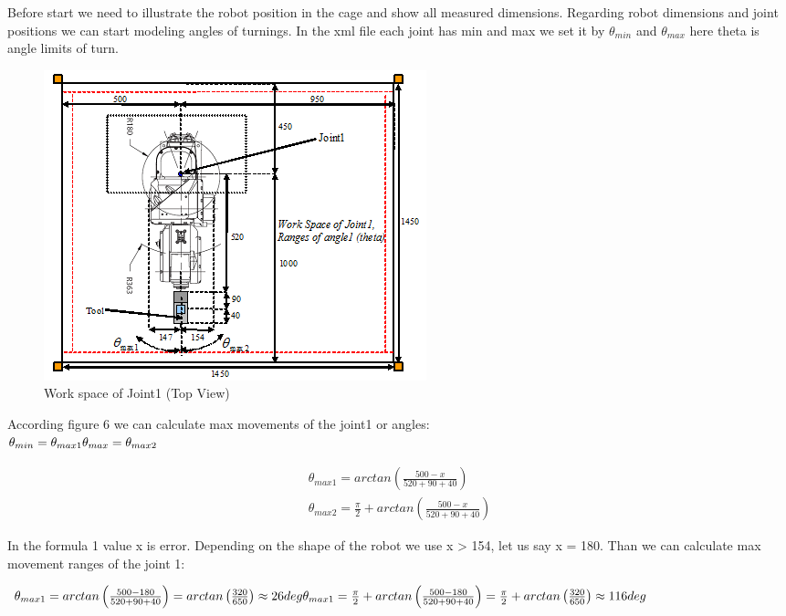 Before start we need to illustrate the robot position in the cage and show all measured dimensions. Regarding robot dimensions and joint positions we can start modeling angles of turnings. In the xml file each joint has min and max we set it by $\theta _{min}$ and $\theta _{max}$ here theta is angle limits of turn.

\begin{figure}[H]
  \centering
  \includegraphics[scale= 1]{source/JointWorkspaceDimensions.png}
  \caption{Work space of Joint1 (Top View)}
  \label{fig:JointWorkspaceDimensions}
\end{figure}

According figure 6 we can calculate max movements of the joint1 or angles: \\

\noindent$\theta _{min}=\theta _{max1}\\
\theta _{max}=\theta _{max2}$

\begin{align}
\theta _{max1}=arctan\left ( \frac{500-x}{520+90+40} \right ) \label{eq:eq0}\\
\theta _{max2}=\frac{\pi }{2}+arctan\left ( \frac{500-x}{520+90+40} \right )\label{eq:eq1}
\end{align}

In the formula 1 value x is error. Depending on the shape of the robot we use x > 154, let us say x = 180. Than we can calculate max movement ranges of the joint 1:

\noindent$\theta _{max1}=arctan\left ( \frac{500-180}{520+90+40} \right )=arctan\left ( \frac{320}{650} \right )\approx 26deg \\
\theta _{max1}=\frac{\pi }{2}+arctan\left ( \frac{500-180}{520+90+40} \right )=\frac{\pi }{2}+arctan\left ( \frac{320}{650} \right )\approx 116deg$\\


